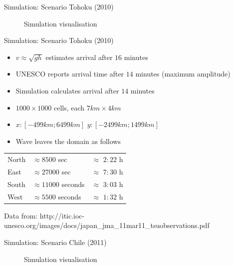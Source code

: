 \documentclass[shortpres]{beamer}
\begin{document}
\begin{frame}{Simulation: Scenario Tohoku (2010)}
	\begin{figure}
		\caption*{Simulation visualisation}
	\end{figure}
\end{frame}

\begin{frame}{Simulation: Scenario Tohoku (2010)}
		\begin{itemize}
			\item $v \approx \sqrt{gh}$ estimates arrival after $16$ minutes
			\item UNESCO reports arrival time after $14$ minutes (maximum amplitude)
			\item Simulation calculates arrival after $14$ minutes
			\item $1000 \times 1000$ cells, each $7 km \times 4 km$
			\item $x: [-499 km; 6499 km]$ \hspace{10pt} $y: [-2499 km; 1499 km]$
			\item Wave leaves the domain as follows
		\end{itemize}
		\begin{tabular}{lll}
			North & $\approx 8500$ sec & $\approx$ $2:22$ h\\
			East & $\approx 27000$ sec & $\approx$ $7:30$ h\\
			South & $\approx 11000$ seconds & $\approx$ $3:03$ h\\
			West & $\approx 5500$ seconds & $\approx$ $1:32$ h\\
		\end{tabular}
		\vfill
		\flushleft
		{\fontsize{5}{5} \selectfont Data from: http://itic.ioc-unesco.org/images/docs/japan\_jma\_11mar11\_tsuobservations.pdf}	
\end{frame}

\begin{frame}{Simulation: Scenario Chile (2011)}
	\begin{figure}
		\centering
		\caption*{Simulation visualisation}
	\end{figure}
\end{frame}
\end{document}
